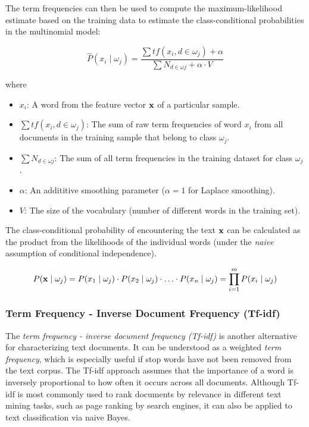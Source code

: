 \documentclass{article}
\begin{document}
The term frequencies can then be used to compute the maximum-likelihood estimate based on the training data to estimate the class-conditional probabilities in the multinomial model:

\begin{equation} \hat{P}(x_i \mid \omega_j) = \frac{\sum tf(x_i, d \in \omega_j) + \alpha}{\sum N_{d \in \omega j} + \alpha \cdot V} \end{equation} 

where

\begin{itemize}
\item  $x_i$: A word from the feature vector $\textbf x$ of a particular sample.
\item  $\sum tf(x_i, d \in \omega_j)$: The sum of raw term frequencies of word $x_i$ from all documents in the training sample that belong to class $\omega_j$.
\item  $\sum N_{d \in \omega j}$: The sum of all term frequencies in the training dataset for class $\omega_j$.
\item $\alpha$: An addititive smoothing parameter ($\alpha = 1$ for Laplace smoothing).
\item  $V$: The size of the vocabulary (number of different words in the training set).
\end{itemize}

The class-conditional probability of encountering the text $\textbf x$ can be calculated as the product from the likelihoods of the individual words (under the \emph{naive} assumption of conditional independence).

\begin{equation} P(\textbf x \mid \omega_j) = P(x_1 \mid \omega_j) \cdot P(x_2 \mid \omega_j) \cdot   \dotsc \cdot P(x_n \mid \omega_j) = \prod_{i= 1}^{m}  P(x_i \mid \omega_j)  \end{equation}



\subsubsection{Term Frequency - Inverse Document Frequency (Tf-idf)}
\label{sec:tf-idf}

The \emph{term frequency - inverse document frequency (Tf-idf)} is another alternative for characterizing text documents. It can be understood as a weighted \emph{term frequency}, which is especially useful if stop words have  not been removed from the text corpus. The Tf-idf approach assumes that the importance of a word is inversely proportional to how often it occurs across all documents. Although Tf-idf is most commonly used to rank documents by relevance in different text mining tasks, such as page ranking by search engines, it can also be applied to text classification via naive Bayes.
\end{document}
